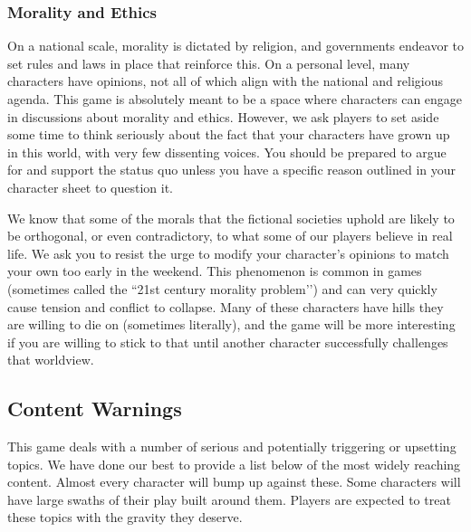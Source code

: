 \documentclass[sheet]{PP}
\begin{document}
\subsubsection{Morality and Ethics}
On a national scale, morality is dictated by religion, and governments endeavor to set rules and laws in place that reinforce this. On a personal level, many characters have opinions, not all of which align with the national and religious agenda. This game is absolutely meant to be a space where characters can engage in discussions about morality and ethics. However, we ask players to set aside some time to think seriously about the fact that your characters have grown up in this world, with very few dissenting voices. You should be prepared to argue for and support the status quo unless you have a specific reason outlined in your character sheet to question it.

We know that some of the morals that the fictional societies uphold are likely to be orthogonal, or even contradictory, to what some of our players believe in real life. We ask you to resist the urge to modify your character's opinions to match your own too early in the weekend. This phenomenon is common in games (sometimes called the ``21st century morality problem'’) and can very quickly cause tension and conflict to collapse. Many of these characters have hills they are willing to die on (sometimes literally), and the game will be more interesting if you are willing to stick to that until another character successfully challenges that worldview. 

\subsection{Content Warnings}
This game deals with a number of serious and potentially triggering or upsetting topics. We have done our best to provide a list below of the most widely reaching content. Almost every character will bump up against these. Some characters will have large swaths of their play built around them. Players are expected to treat these topics with the gravity they deserve.
\end{document}

